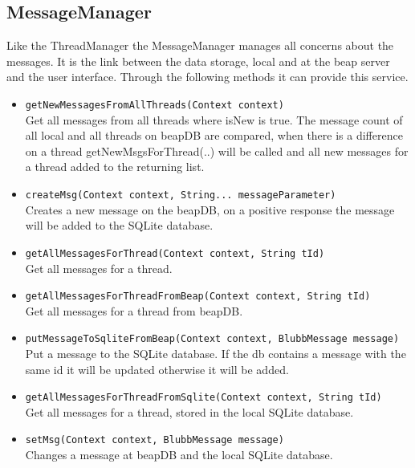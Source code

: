 \documentclass[12pt,a4paper,oneside]{report}
\newcommand{\code}[1]{\lstinline{#1}}
\begin{document}
\subsection{MessageManager}
Like the ThreadManager the MessageManager manages all concerns about the messages. It is the link between the data storage, local and at the beap server and the user interface. Through the following methods it can provide this service.
\begin{itemize}
\item{\code{getNewMessagesFromAllThreads(Context context)}}\\
Get all messages from all threads where isNew is true. The message count of all local and all threads on beapDB are compared, when there is a difference on a thread getNewMsgsForThread(..) will be called and all new messages for a thread added to the returning list.

\item{\code{createMsg(Context context, String... messageParameter)}}\\
 Creates a new message on the beapDB, on a positive response the message will be added to the SQLite database.
     
\item{\code{getAllMessagesForThread(Context context, String tId)}}\\
Get all messages for a thread.

\item{\code{getAllMessagesForThreadFromBeap(Context context, String tId)}}\\
Get all messages for a thread from beapDB.

\item{\code{putMessageToSqliteFromBeap(Context context, BlubbMessage message)}}\\
 Put a message to the SQLite database. If the db contains a message with the same id it will be updated otherwise it will be added.
     
\item{\code{getAllMessagesForThreadFromSqlite(Context context, String tId)}}\\
Get all messages for a thread, stored in the local SQLite database.

\item{\code{setMsg(Context context, BlubbMessage message)}}\\
Changes a message at beapDB and the local SQLite database.
\end{itemize}
\end{document}
